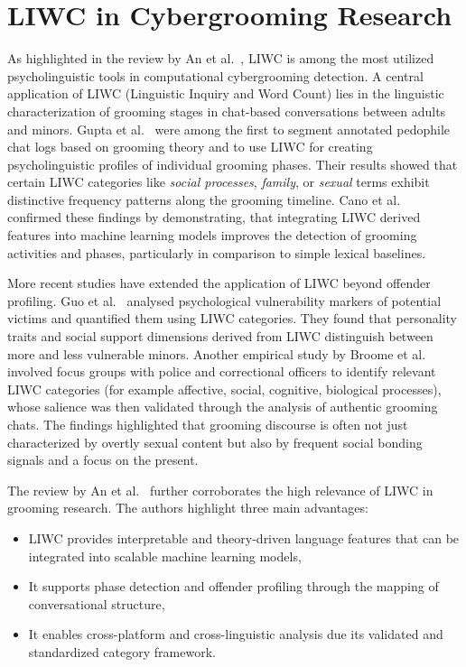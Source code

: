 \section{LIWC in Cybergrooming Research}
 As highlighted in the review by An et al.~\cite{an2025cybergrooming}, LIWC is among the most utilized psycholinguistic tools in computational cybergrooming detection. 
 A central application of LIWC (Linguistic Inquiry and Word Count) lies in the linguistic characterization of grooming stages in chat-based conversations between adults and minors. Gupta et al.~\cite{gupta2012characterizingpedophileconversationsinternet} were among the first to segment annotated pedophile chat logs based on grooming theory and to use LIWC for creating psycholinguistic profiles of individual grooming phases. Their results showed that certain LIWC categories like \textit{social processes}, \textit{family}, or \textit{sexual} terms exhibit distinctive frequency patterns along the grooming timeline. Cano et al.~\cite{Cano2014} confirmed these findings by demonstrating, that integrating LIWC derived features into machine learning models improves the detection of grooming activities and phases, particularly in comparison to simple lexical baselines. %

More recent studies have extended the application of LIWC beyond offender profiling. Guo et al.~\cite{guo2023text} analysed psychological vulnerability markers of potential victims and quantified them using LIWC categories. %
 They found that personality traits and social support dimensions derived from LIWC distinguish between more and less vulnerable minors.  %
 Another empirical study by Broome et al.~\cite{broome2020psycholinguistic} involved focus groups with police and correctional officers to identify relevant LIWC categories (for example affective, social, cognitive, biological processes), whose salience was then validated through the analysis of authentic grooming chats. The findings highlighted that grooming discourse is often not just characterized by overtly sexual content but also by frequent social bonding signals and a focus on the present. %

The review by An et al.~\cite{an2025cybergrooming} further corroborates the high relevance of LIWC in grooming research. The authors highlight three main advantages:
\begin{itemize}
    \item LIWC provides interpretable and theory-driven language features that can be integrated into scalable machine learning models,
    \item It supports phase detection and offender profiling through the mapping of conversational structure,
    \item It enables cross-platform and cross-linguistic analysis due its validated and standardized category framework.
\end{itemize} %


